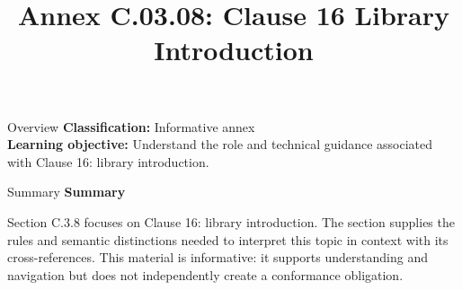 \documentclass[10pt,letterpaper]{article}
\title{Annex C.03.08: Clause 16 Library Introduction}
\author{}
\date{}
\begin{document}
\maketitle
\begin{CornellOverviewBox}{Overview}
\textbf{Classification:} Informative annex\\[2pt]
\textbf{Learning objective:} Understand the role and technical guidance associated with Clause 16: library introduction.
\end{CornellOverviewBox}\begin{CornellSummaryBox}{Summary}
{\sffamily\bfseries\color{Accent} Summary}\par\vspace{3pt}Section C.3.8 focuses on Clause 16: library introduction. The section supplies the rules and semantic distinctions needed to interpret this topic in context with its cross-references. This material is informative: it supports understanding and navigation but does not independently create a conformance obligation.
\end{CornellSummaryBox}
\end{document}
